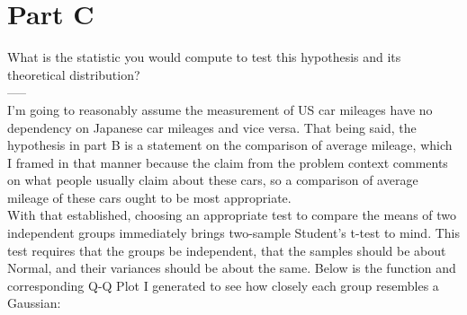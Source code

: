 \section{Part C}
What is the statistic you would compute to test this hypothesis and its theoretical distribution?\\
-----\\

I'm going to reasonably assume the measurement of US car mileages have no dependency on Japanese car mileages and vice versa. That being said, the hypothesis in part B is a statement on the comparison of average mileage, which I framed in that manner because the claim from the problem context comments on what people usually claim about these cars, so a comparison of average mileage of these cars ought to be most appropriate.\\

With that established, choosing an appropriate test to compare the means of two independent groups immediately brings two-sample Student's t-test to mind. This test requires that the groups be independent, that the samples should be about Normal, and their variances should be about the same. Below is the function and corresponding Q-Q Plot I generated to see how closely each group resembles a Gaussian:


